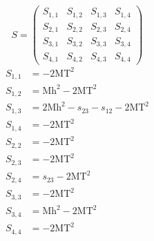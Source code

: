 \documentclass[a4paper]{article}
\begin{document}
\begin{equation}
S=\left(\begin{array}{cccc}
   S_{1,1}&
   S_{1,2}&
   S_{1,3}&
   S_{1,4}\\
   S_{2,1}&
   S_{2,2}&
   S_{2,3}&
   S_{2,4}\\
   S_{3,1}&
   S_{3,2}&
   S_{3,3}&
   S_{3,4}\\
   S_{4,1}&
   S_{4,2}&
   S_{4,3}&
   S_{4,4}\end{array}\right)
\end{equation}
\begin{subequations}
\begin{align}
   S_{1,1}&=-2\text{MT}^2\\
   S_{1,2}&=\text{Mh}^2-2\text{MT}^2\\
   S_{1,3}&=2\text{Mh}^2-s_{23}-s_{12}-2\text{MT}^2\\
   S_{1,4}&=-2\text{MT}^2\\
   S_{2,2}&=-2\text{MT}^2\\
   S_{2,3}&=-2\text{MT}^2\\
   S_{2,4}&=s_{23}-2\text{MT}^2\\
   S_{3,3}&=-2\text{MT}^2\\
   S_{3,4}&=\text{Mh}^2-2\text{MT}^2\\
   S_{4,4}&=-2\text{MT}^2
\end{align}
\end{subequations}
\end{document}
